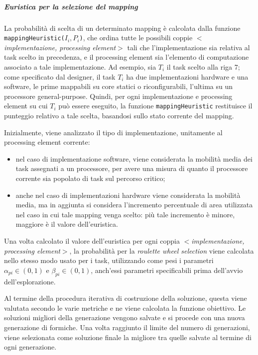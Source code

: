 \subparagraph{Euristica per la selezione del mapping}
La probabilit\`a di scelta di un determinato mapping \`e calcolata dalla funzione
\verb+mappingHeuristic(+$I_i, P_i$\verb+)+, che ordina tutte le possibili coppie
$<$\emph{implementazione, processing element}$>$ tali che l'implementazione sia relativa
al task scelto in precedenza, e il processing element sia l'elemento di computazione associato
a tale implementazione. Ad esempio, sia $T_i$ il task scelto alla riga 7; come specificato
dal designer, il task $T_i$ ha due implementazioni hardware e una software, le prime
mappabili su core statici o riconfigurabili, l'ultima su un processore general-purpose.
Quindi, per ogni implementazione e processing element su cui $T_i$ pu\`o essere eseguito,
la funzione \verb+mappingHeuristic+ restituisce il punteggio relativo a tale scelta,
basandosi sullo stato corrente del mapping.

Inizialmente, viene analizzato il tipo di implementazione, unitamente al processing element corrente:
\begin{itemize}
  \item nel caso di implementazione software, viene considerata la mobilit\`a media dei task assegnati a un processore,
    per avere una misura di quanto il processore corrente sia popolato di task sul percorso critico;
  \item anche nel caso di implementazioni hardware viene considerata la mobilit\`a media, ma in aggiunta
    si considera l'incremento percentuale di area utilizzata nel caso in cui tale mapping venga scelto:
    pi\`u tale incremento \`e minore, maggiore \`e il valore dell'euristica.
\end{itemize}
Una volta calcolato il valore dell'euristica per ogni coppia
$<$\emph{implementazione, processing element}$>$, la probabilit\`a per la \emph{roulette wheel selection}
viene calcolata nello stesso modo usato per i task, utilizzando come pesi i parametri $\alpha_{pi} \in (0,1)$
e $\beta_{pi} \in (0,1)$, anch'essi parametri specificabili prima dell'avvio dell'esplorazione.


Al termine della procedura iterativa di costruzione della soluzione, questa viene valutata
secondo le varie metriche e ne viene calcolata la funzione obiettivo. Le soluzioni migliori
della generazione vengono salvate e si procede con una nuova generazione di formiche.
Una volta raggiunto il limite del numero di generazioni, viene selezionata come
soluzione finale la migliore tra quelle salvate al termine di ogni generazione.

